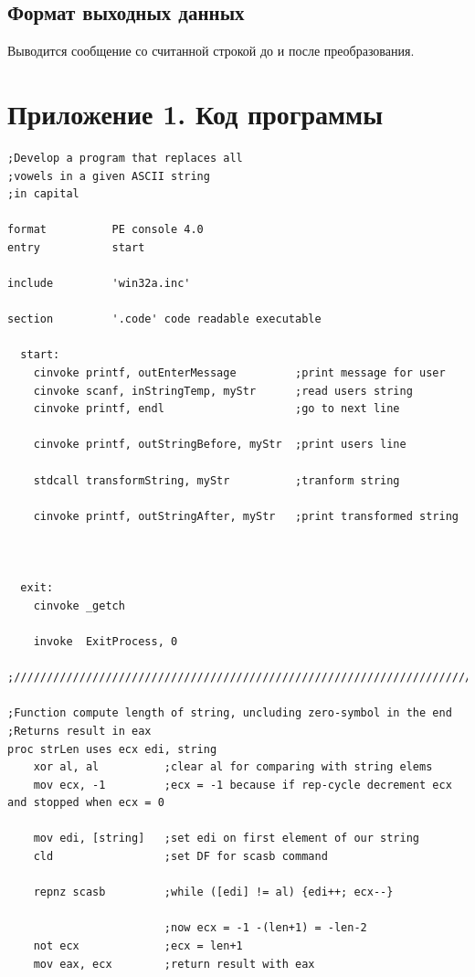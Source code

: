 \documentclass[14pt,a4paper]{article}
\begin{document}
    \subsection{Формат выходных данных}\par{
        Выводится сообщение со считанной строкой до и после преобразования.
    }

    \newpage
    \section{Приложение 1. Код программы}
    \begin{verbatim}
;Develop a program that replaces all
;vowels in a given ASCII string
;in capital

format          PE console 4.0
entry           start

include         'win32a.inc' 
 
section         '.code' code readable executable
 
  start:
    cinvoke printf, outEnterMessage         ;print message for user
    cinvoke scanf, inStringTemp, myStr      ;read users string	
    cinvoke printf, endl                    ;go to next line

    cinvoke printf, outStringBefore, myStr  ;print users line

    stdcall transformString, myStr          ;tranform string
	
    cinvoke printf, outStringAfter, myStr   ;print transformed string



  exit:
    cinvoke _getch

    invoke  ExitProcess, 0

;///////////////////////////////////////////////////////////////////////

;Function compute length of string, uncluding zero-symbol in the end
;Returns result in eax
proc strLen uses ecx edi, string
    xor al, al          ;clear al for comparing with string elems
    mov ecx, -1         ;ecx = -1 because if rep-cycle decrement ecx and stopped when ecx = 0

    mov edi, [string]   ;set edi on first element of our string
    cld                 ;set DF for scasb command

    repnz scasb         ;while ([edi] != al) {edi++; ecx--}

                        ;now ecx = -1 -(len+1) = -len-2
    not ecx             ;ecx = len+1
    mov eax, ecx        ;return result with eax


\end{verbatim}
\end{document}
